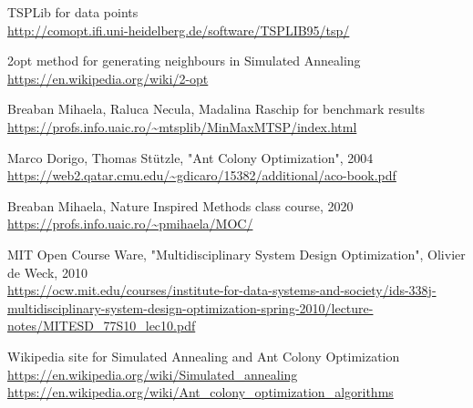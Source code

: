 \documentclass{article}
\begin{document}

\begin{thebibliography}{9}
\bibitem{} 
TSPLib for data points
\\\url{http://comopt.ifi.uni-heidelberg.de/software/TSPLIB95/tsp/}

\bibitem{} 
2opt method for generating neighbours in Simulated Annealing
\\\url{https://en.wikipedia.org/wiki/2-opt}

\bibitem{} 
Breaban Mihaela, Raluca Necula, Madalina Raschip for benchmark results
\\\url{https://profs.info.uaic.ro/~mtsplib/MinMaxMTSP/index.html}

\bibitem{} 
Marco Dorigo, Thomas Stützle, "Ant Colony Optimization", 2004
\\\url{https://web2.qatar.cmu.edu/~gdicaro/15382/additional/aco-book.pdf}

\bibitem{} 
Breaban Mihaela, Nature Inspired Methods class course, 2020
\\\url{https://profs.info.uaic.ro/~pmihaela/MOC/}

\bibitem{} 
MIT Open Course Ware, "Multidisciplinary System Design Optimization", Olivier de Weck, 2010
\\\url{https://ocw.mit.edu/courses/institute-for-data-systems-and-society/ids-338j-multidisciplinary-system-design-optimization-spring-2010/lecture-notes/MITESD_77S10_lec10.pdf}

\bibitem{} 
Wikipedia site for Simulated Annealing and Ant Colony Optimization
\\\url{https://en.wikipedia.org/wiki/Simulated_annealing}
\\\url{https://en.wikipedia.org/wiki/Ant_colony_optimization_algorithms}

\end{thebibliography}
\end{document}
